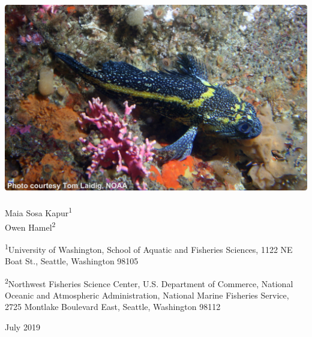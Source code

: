 
\begin{center}
\thispagestyle{empty}

\vspace{.5cm}

\includegraphics{chinarockfish_small}~\\[1cm]

Maia Sosa Kapur\textsuperscript{1}\\
Owen Hamel\textsuperscript{2}\\

\vspace{.5cm}

\small
\textsuperscript{1}University of Washington, School of Aquatic and Fisheries Sciences, 1122 NE Boat St., Seattle, Washington 98105\\

\vspace{.3cm}

\textsuperscript{2}Northwest Fisheries Science Center, U.S. Department of Commerce, National Oceanic and Atmospheric Administration, National Marine Fisheries Service, 2725 Montlake Boulevard East, Seattle, Washington 98112\\

\vspace{.3cm}

\vfill

\vspace{.2cm}
{\large July 2019}

\maketitle

\setcounter{page}{1}
\end{center}


